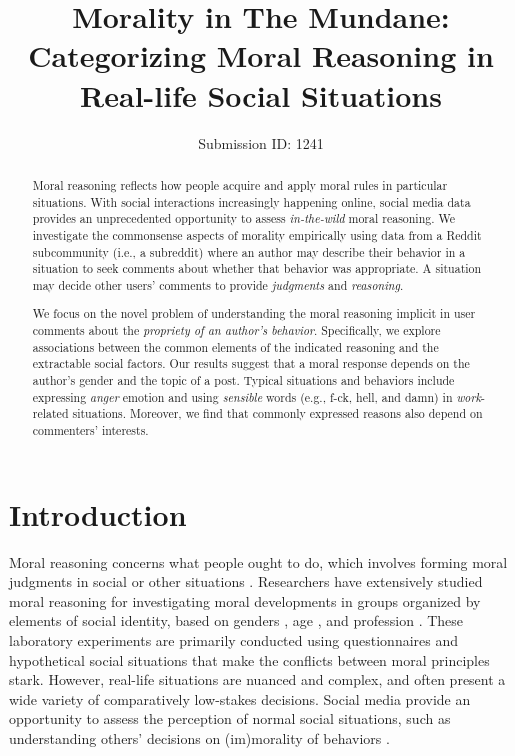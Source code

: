 \documentclass[letterpaper]{article} %
\title{Morality in The Mundane: \\ Categorizing Moral Reasoning in Real-life Social Situations
}
\author{
    Submission ID: 1241    
}
\begin{document}
\maketitle
\pagestyle{plain}

\begin{abstract}
Moral reasoning reflects how people acquire and apply moral rules in particular situations.
With social interactions increasingly happening online, social media data provides an unprecedented opportunity to assess \emph{in-the-wild} moral reasoning.
We investigate the commonsense aspects of morality empirically using data from a Reddit subcommunity (i.e., a subreddit) where an author may describe their behavior in a situation to seek comments about whether that behavior was appropriate.
A situation may decide other users' comments to provide \emph{judgments} and \emph{reasoning}.

We focus on the novel problem of understanding the moral reasoning implicit in user comments about the \emph{propriety of an author's behavior}.
Specifically, we explore associations between the common elements of the indicated reasoning and the extractable social factors.
Our results suggest that a moral response depends on the author's gender and the topic of a post.
Typical situations and behaviors include expressing \textsl{anger} emotion and using \textsl{sensible} words (e.g., f-ck, hell, and damn) in \textsl{work}-related situations.
Moreover, we find that commonly expressed reasons also depend on commenters' interests.
\end{abstract}

\section{Introduction}
\label{sec:introduction}
Moral reasoning concerns what people ought to do, which involves forming moral judgments in social or other situations \cite{sep-reasoning-moral}.
Researchers have extensively studied moral reasoning for investigating moral developments in groups organized by elements of social identity, based on genders \cite{bussey-1982-gender}, age \cite{lawrence-1989-long}, and profession \cite{wood-1988-ethical}.
These laboratory experiments are primarily conducted using questionnaires and hypothetical social situations that make the conflicts between moral principles stark.
However, real-life situations are nuanced and complex, and often present a wide variety of comparatively low-stakes decisions.
Social media provide an opportunity to assess the perception of normal social situations, such as understanding others' decisions on (im)morality of behaviors \cite{lourie-2020-scruples}.
\end{document}
